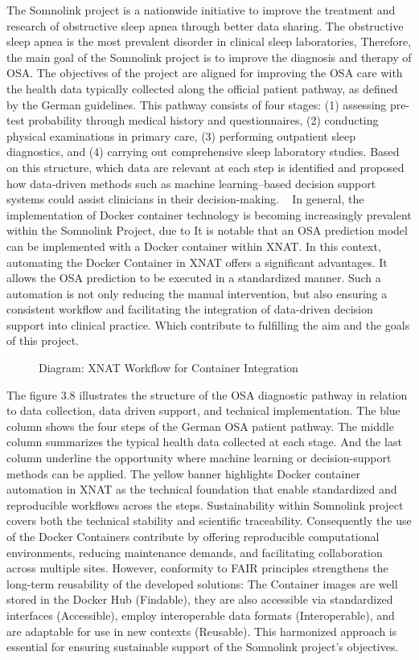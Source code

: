 The Somnolink project is a nationwide initiative to improve the treatment and research of obstructive sleep apnea through better data sharing. The obstructive sleep apnea is the most prevalent disorder in clinical sleep laboratories, Therefore, the main goal of the Somnolink project is to improve the diagnosis and therapy of OSA.
The objectives of the project are aligned for improving the OSA care with the health data typically collected along the official patient pathway, as defined by the German guidelines. This pathway consists of four stages: (1) assessing pre-test probability through medical history and questionnaires, (2) conducting physical examinations in primary care, (3) performing outpatient sleep diagnostics, and (4) carrying out comprehensive sleep laboratory studies. Based on this structure, which data are relevant at each step is identified and proposed how data-driven methods such as machine learning–based decision support systems could assist clinicians in their decision-making. ~\cite{krefting_somnolink_2025}
In general, the implementation of Docker container technology is becoming increasingly prevalent within the Somnolink Project, due to It is notable that an OSA prediction model can be implemented with a Docker container within XNAT.
In this context, automating the Docker Container in XNAT offers a significant advantages. It allows the OSA prediction to be executed in a standardized manner. Such a automation is not only reducing the manual intervention, but also ensuring a consistent  workflow and facilitating  the integration of data-driven decision support into clinical practice. Which contribute to fulfilling the aim and the goals of this project.
\begin{figure}[ht]
    \centering
    \def\svgwidth{\linewidth} 
    
    \caption{Diagram: XNAT Workflow for Container Integration}
    \label{fig:workflowxnat}
\end{figure}

The figure 3.8 illustrates the structure of the OSA diagnostic pathway in relation to data collection, data driven support, and technical implementation.
The blue column shows the four steps of the German OSA patient pathway. The middle column summarizes the typical health data collected at each stage. And the last column underline the opportunity where machine learning or decision-support methods can be applied. 
The yellow banner highlights Docker container automation in XNAT  as the technical foundation that enable standardized and reproducible workflows across the steps.
Sustainability within Somnolink project covers both the technical stability and scientific traceability. Consequently the use of the Docker Containers contribute by offering reproducible computational environments, reducing maintenance demands, and facilitating collaboration across multiple sites. However, conformity to FAIR principles strengthens the long-term reusability of the developed solutions: The Container images are well stored in the Docker Hub (Findable), they are also accessible via standardized interfaces (Accessible), employ interoperable data formats (Interoperable), and are adaptable for use in new contexts (Reusable). This harmonized approach is essential for ensuring sustainable support of the Somnolink project’s objectives. 
